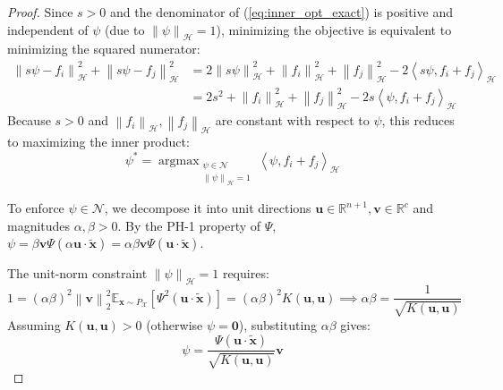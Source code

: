 \documentclass[11pt, a4paper, copyright, gdm]{google}
\newcommand{\norm}[1]{\left\lVert#1\right\rVert}
\newcommand{\inner}[2]{\left\langle#1, #2\right\rangle}
\newcommand{\uVect}{\boldsymbol{u}}
\newcommand{\vVect}{\boldsymbol{v}}
\newcommand{\xVect}{\boldsymbol{x}}
\newcommand{\zeroVect}{\boldsymbol{0}}
\newcommand{\calH}{\mathcal{H}}
\newcommand{\calN}{\mathcal{N}}
\newcommand{\calX}{\mathcal{X}}
\newcommand{\R}{\mathbb{R}}
\newcommand{\E}{\mathbb{E}}
\DeclareMathOperator{\argmax}{argmax}
\theoremstyle{definition}
\begin{document}
\begin{proof}
Since $s>0$ and the denominator of (\ref{eq:inner_opt_exact}) is positive and independent of $\psi$ (due to $\norm{\psi}_{\calH} = 1$), minimizing the objective is equivalent to minimizing the squared numerator:
\begin{align}
    \norm{s \psi - f_i}_{\calH}^2 + \norm{s \psi - f_j}_{\calH}^2 &= 2 \norm{s \psi}_{\calH}^2 + \norm{f_i}_{\calH}^2 + \norm{f_j}_{\calH}^2 - 2 \inner{s \psi}{f_i + f_j}_{\calH} \nonumber \\
    \label{eq:expanded_numerator}
    &= 2 s^2 + \norm{f_i}_{\calH}^2 + \norm{f_j}_{\calH}^2 - 2 s \inner{\psi}{f_i + f_j}_{\calH}
\end{align}
Because $s > 0$ and $\norm{f_i}_{\calH}, \norm{f_j}_{\calH}$ are constant with respect to $\psi$, this reduces to maximizing the inner product:
\begin{equation}
\label{eq:alignment_reduced}
\psi^* = \argmax_{\substack{\psi \in \calN \\ \norm{\psi}_{\calH} = 1}} \inner{\psi}{f_i + f_j}_{\calH}
\end{equation}

To enforce $\psi \in \calN$, we decompose it into unit directions $\uVect \in \R^{n+1}, \vVect \in \R^c$ and magnitudes $\alpha, \beta > 0$. By the PH-1 property of $\Psi$, $\psi = \beta \vVect \Psi(\alpha \uVect \cdot \tilde{\xVect}) = \alpha \beta \vVect \Psi(\uVect \cdot \tilde{\xVect})$. 

The unit-norm constraint $\norm{\psi}_{\calH} = 1$ requires:
\begin{equation*}
    1 = (\alpha \beta)^2 \norm{\vVect}_2^2 \E_{\xVect \sim P_\calX} \left[ \Psi^2( \uVect \cdot \tilde{\xVect}) \right] = (\alpha \beta)^2 K(\uVect,\uVect) \implies \alpha \beta = \frac{1}{\sqrt{K(\uVect,\uVect)}}
\end{equation*}
Assuming $K(\uVect, \uVect) > 0$ (otherwise $\psi = \zeroVect$), substituting $\alpha \beta$ gives:
\begin{equation*}
    \psi = \frac{\Psi(\uVect \cdot \tilde{\xVect})}{\sqrt{K(\uVect,\uVect)}} \vVect
\end{equation*}


\end{proof}
\end{document}
